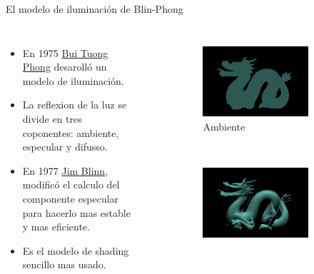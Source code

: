 \begin{frame}{El modelo de iluminación de Blin-Phong}
\begin{columns}
\begin{itemize}
 \item En 1975 \href{https://en.wikipedia.org/wiki/Phong_reflection_model}{Bui Tuong Phong} desarolló un modelo de iluminación.
 \item La reflexion de la luz se divide en tres coponentes: ambiente, especular y difusso.
 \item En 1977 \href{https://en.wikipedia.org/wiki/Blinn-Phong_reflection_model}{Jim Blinn}, modificó el calculo del componente especular para hacerlo mas estable y mas eficiente.
 \item Es el modelo de shading sencillo mas usado.
\end{itemize}
\begin{figure}[htp]
 \centering
 \begin{subfigure}[b]{0.42\textwidth}
   \includegraphics[width=\textwidth]{img/ambiente}
   \caption{Ambiente}
 \end{subfigure}
~
 \begin{subfigure}[b]{0.42\textwidth}
   \includegraphics[width=\textwidth]{img/difuso}

\end{subfigure}
\end{figure}
\end{columns}
\end{frame}
